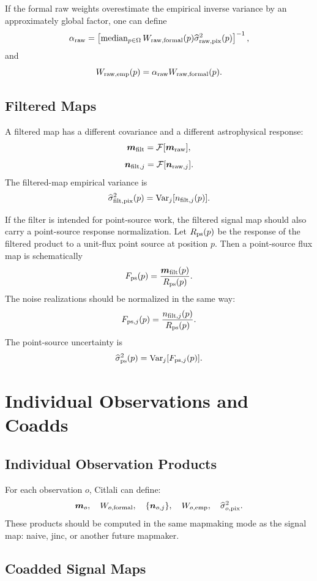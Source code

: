 \documentclass[11pt]{article}
\newcommand{\map}{\boldsymbol{m}}
\newcommand{\noise}{\boldsymbol{n}}
\newcommand{\var}{\operatorname{Var}}
\newcommand{\median}{\operatorname{median}}
\begin{document}
If the formal raw weights overestimate the empirical inverse variance by an
approximately global factor, one can define
\[
  \alpha_{\rm raw}
    =
    \left[
      \median_{p\in\Omega}
      W_{{\rm raw},{\rm formal}}(p)
      \widehat{\sigma}^2_{{\rm raw},{\rm pix}}(p)
    \right]^{-1},
\]
and
\[
  W_{{\rm raw},{\rm emp}}(p)
    =
    \alpha_{\rm raw}
    W_{{\rm raw},{\rm formal}}(p).
\]

\subsection{Filtered Maps}

A filtered map has a different covariance and a different astrophysical
response:
\[
  \map_{\rm filt} = {\cal F}[\map_{\rm raw}],
\]
\[
  \noise_{{\rm filt},j} = {\cal F}[\noise_{{\rm raw},j}].
\]
The filtered-map empirical variance is
\[
  \widehat{\sigma}^2_{{\rm filt},{\rm pix}}(p)
    =
    \var_j[n_{{\rm filt},j}(p)].
\]

If the filter is intended for point-source work, the filtered signal map should
also carry a point-source response normalization. Let \(R_{\rm ps}(p)\) be the
response of the filtered product to a unit-flux point source at position \(p\).
Then a point-source flux map is schematically
\[
  F_{\rm ps}(p) =
    \frac{\map_{\rm filt}(p)}{R_{\rm ps}(p)}.
\]
The noise realizations should be normalized in the same way:
\[
  F_{{\rm ps},j}(p) =
    \frac{n_{{\rm filt},j}(p)}{R_{\rm ps}(p)}.
\]
The point-source uncertainty is
\[
  \widehat{\sigma}^2_{{\rm ps}}(p)
    =
    \var_j[F_{{\rm ps},j}(p)].
\]

\section{Individual Observations and Coadds}

\subsection{Individual Observation Products}

For each observation \(o\), Citlali can define:
\[
  \map_o,
  \quad
  W_{o,{\rm formal}},
  \quad
  \{\noise_{o,j}\},
  \quad
  W_{o,{\rm emp}},
  \quad
  \widehat{\sigma}^2_{o,{\rm pix}}.
\]
These products should be computed in the same mapmaking mode as the signal map:
naive, jinc, or another future mapmaker.

\subsection{Coadded Signal Maps}
\end{document}

